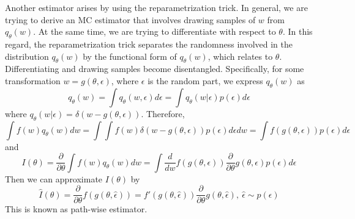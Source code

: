 Another estimator arises by using the reparametrization trick. 
In general, we are trying to derive an MC estimator that involves drawing samples of $w$ from $q_{\theta}(w)$. 
At the same time, we are trying to differentiate with respect to $\theta$. 
In this regard, the reparametrization trick separates the randomness involved in the distribution $q_{\theta}(w)$ by the functional form of $q_{\theta}(w)$, which relates to $\theta$. 
Differentiating and drawing samples become disentangled. 
Specifically, for some transformation $w = g(\theta,\epsilon)$, where $\epsilon$ is the random part, we express $q_{\theta}(w)$ as
\begin{equation}
q_{\theta}(w)=
\int  q_{\theta}(w, \epsilon)d\epsilon = \int  q_{\theta}(w| \epsilon)p(\epsilon)d\epsilon
\end{equation}
where $q_{\theta}(w| \epsilon) = \delta(w-g(\theta,\epsilon))$.
Therefore,
\begin{equation}
\int f(w)q_{\theta}(w)dw = \int \int f(w) \delta(w-g(\theta,\epsilon))p(\epsilon)d\epsilon dw =\int f(g(\theta,\epsilon))p(\epsilon)d\epsilon 
\end{equation}
and
\begin{equation}
I(\theta) = \frac{\partial}{\partial \theta} \int f(w)q_{\theta}(w)dw=
\int \frac{d}{dw}f(g(\theta,\epsilon)) \frac{\partial}{\partial \theta}g(\theta,\epsilon)p(\epsilon)d\epsilon 
\end{equation}
Then we can approximate $I(\theta)$ by
\begin{equation}\label{}
\hat{I}(\theta) = \frac{\partial}{\partial \theta}f(g(\theta,\hat{\epsilon}))=f'(g(\theta,\hat{\epsilon})) \frac{\partial}{\partial \theta}g(\theta,\hat{\epsilon})  , \ \hat{\epsilon} \sim p(\epsilon)
\end{equation}
This is known as path-wise estimator.

